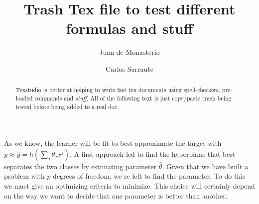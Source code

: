 \documentclass{article}%
\newcommand{\Expect}{{\mathbb{E}}}
\newtheorem{definition}{Definition}[subsection]
\theoremstyle{definition}
\begin{document}
\title{Trash Tex file to test different formulas and stuff}




\author{
	Juan de Monasterio
	\and Carlos Sarraute
}

%
%


\maketitle
\begin{abstract}
	
	Texstudio is better at helping to write fast tex documents using spell-checkers, pre-loaded commands and \textit{stuff}. All of the following text is just copy/paste trash being tested before being added to a real doc.
	



\end{abstract} 


As we know, the learner will be fit to best approximate the target with $y \approx \hat{y} = h\left(\sum_{j}\theta_j x^j\right)$. A first approach led to find the hyperplane that best separates the two classes by estimating parameter $\hat{\theta}$. Given that we have built a problem with $p$ degrees of freedom, we re left to find the parameter. To do this we must give an optimizing criteria to minimize. This choice will certainly depend on the way we want to decide that one parameter is better than another. 
\end{document}
